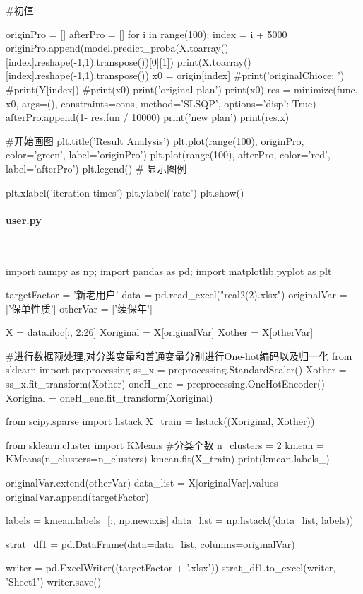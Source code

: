 \documentclass[a4paper]{article}
\begin{document}
\begin{*sec.py*}
			#初值
			
			
			originPro = []
			afterPro = []
			for i in range(100):
			index = i + 5000
			originPro.append(model.predict_proba(X.toarray()[index].reshape(-1,1).transpose())[0][1])
			print(X.toarray()[index].reshape(-1,1).transpose())
			x0 = origin[index]
			#print('originalChioce: ')
			#print(Y[index])
			#print(x0)
			print('original plan')
			print(x0)
			res = minimize(func, x0, args=(), constraints=cons, method='SLSQP', options={'disp': True})
			afterPro.append(1- res.fun / 10000)
			print('new plan')
			print(res.x)
			
			#开始画图
			plt.title('Result Analysis')
			plt.plot(range(100), originPro, color='green', label='originPro')
			plt.plot(range(100), afterPro, color='red', label='afterPro')
			plt.legend() # 显示图例
			
			plt.xlabel('iteration times')
			plt.ylabel('rate')
			plt.show()
		\end{*sec.py*}
		\paragraph{user.py}\\
		\begin{1}
			import numpy as np;
			import pandas as pd;
			import matplotlib.pyplot as plt
			
			targetFactor = '新老用户'
			data = pd.read_excel("real2(2).xlsx")
			originalVar = ['保单性质']
			otherVar = ['续保年']
			
			
			X = data.iloc[:, 2:26]
			Xoriginal = X[originalVar]
			Xother = X[otherVar]
			
			#进行数据预处理,对分类变量和普通变量分别进行One-hot编码以及归一化
			from sklearn import preprocessing
			ss_x = preprocessing.StandardScaler()
			Xother = ss_x.fit_transform(Xother)
			oneH_enc = preprocessing.OneHotEncoder()
			Xoriginal = oneH_enc.fit_transform(Xoriginal)
			
			from scipy.sparse import hstack
			X_train = hstack((Xoriginal, Xother))
			
			from sklearn.cluster import KMeans
			#分类个数
			n_clusters = 2
			kmean = KMeans(n_clusters=n_clusters)
			kmean.fit(X_train)
			print(kmean.labels_)
			
			
			
			
			originalVar.extend(otherVar)
			data_list = X[originalVar].values
			originalVar.append(targetFactor)
			
			labels = kmean.labels_[:, np.newaxis]
			data_list = np.hstack((data_list, labels))
			
			
			strat_df1 = pd.DataFrame(data=data_list, columns=originalVar)
			
			writer = pd.ExcelWriter((targetFactor + '.xlsx'))
			strat_df1.to_excel(writer, 'Sheet1')
			writer.save()
		\end{1}
	
	
	
\end{document}
